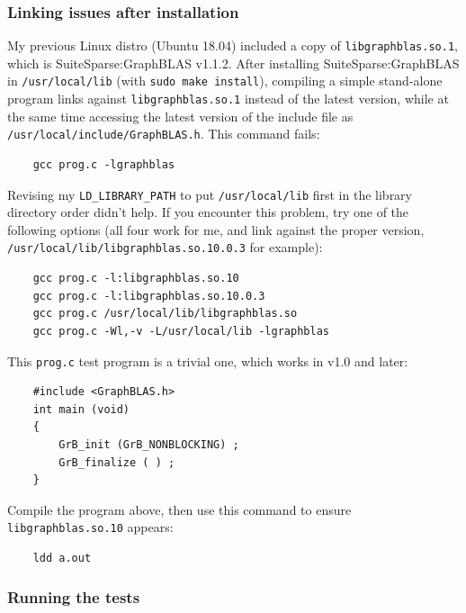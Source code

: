 \subsubsection{Linking issues after installation}

My previous Linux distro (Ubuntu 18.04) included a copy of \verb'libgraphblas.so.1',
which is SuiteSparse:GraphBLAS v1.1.2.  After installing SuiteSparse:GraphBLAS
in \verb'/usr/local/lib' (with \verb'sudo make install'), compiling a simple
stand-alone program links against \verb'libgraphblas.so.1' instead of the
latest version, while at the same time accessing the latest version of the
include file as \verb'/usr/local/include/GraphBLAS.h'.  This command fails:

    {\small
    \begin{verbatim}
    gcc prog.c -lgraphblas \end{verbatim} }

Revising my \verb'LD_LIBRARY_PATH' to put \verb'/usr/local/lib' first in the
library directory order didn't help.  If you encounter this problem, try one of
the following options (all four work for me, and link against the proper
version, \verb'/usr/local/lib/libgraphblas.so.10.0.3' for example):

    {\small
    \begin{verbatim}
    gcc prog.c -l:libgraphblas.so.10
    gcc prog.c -l:libgraphblas.so.10.0.3
    gcc prog.c /usr/local/lib/libgraphblas.so
    gcc prog.c -Wl,-v -L/usr/local/lib -lgraphblas \end{verbatim} }

This \verb'prog.c' test program is a trivial one, which works in v1.0 and
later:

    {\small
    \begin{verbatim}
    #include <GraphBLAS.h>
    int main (void)
    {
        GrB_init (GrB_NONBLOCKING) ;
        GrB_finalize ( ) ;
    } \end{verbatim} }

Compile the program above, then use this command to ensure
\verb'libgraphblas.so.10' appears:

    {\small
    \begin{verbatim}
    ldd a.out \end{verbatim} }

\subsubsection{Running the tests}

